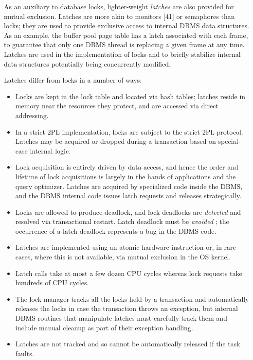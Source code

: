 \documentclass[b5paper,11pt,twoside,openright]{book}
\begin{document}
As an auxiliary to database locks, lighter-weight \emph{latches} are
also provided for mutual exclusion. Latches are more akin to monitors
{[}41{]} or semaphores than locks; they are used to provide exclusive
access to internal DBMS data structures. As an example, the buffer pool
page table has a latch associated with each frame, to guarantee that
only one DBMS thread is replacing a given frame at any time. Latches are
used in the implementation of locks and to briefly stabilize internal
data structures potentially being concurrently modified.

Latches differ from locks in a number of ways:

\begin{itemize}
\item
  Locks are kept in the lock table and located via hash tables; latches
  reside in memory near the resources they protect, and are accessed via
  direct addressing.

  \item
    In a strict 2PL implementation, locks are subject to the strict 2PL
    protocol. Latches may be acquired or dropped during a transaction
    based on special-case internal logic.
  \item
    Lock acquisition is entirely driven by data access, and hence the
    order and lifetime of lock acquisitions is largely in the hands of
    applications and the query optimizer. Latches are acquired by
    specialized code inside the DBMS, and the DBMS internal code issues
    latch requests and releases strategically.
  \item
    Locks are allowed to produce deadlock, and lock deadlocks are
    \emph{detected} and resolved via transactional restart. Latch
    deadlock must be \emph{avoided} ; the occurrence of a latch
    deadlock represents a bug in the DBMS code.
  \item
    Latches are implemented using an atomic hardware instruction or, in
    rare cases, where this is not available, via mutual exclusion in the
    OS kernel.
  \item
    Latch calls take at most a few dozen CPU cycles whereas lock
    requests take hundreds of CPU cycles.
  \item
    The lock manager tracks all the locks held by a transaction and
    automatically releases the locks in case the transaction throws an
    exception, but internal DBMS routines that manipulate latches must
    carefully track them and include manual cleanup as part of their
    exception handling.
  \item
    Latches are not tracked and so cannot be automatically released if
    the task faults.
\end{itemize}
\end{document}

